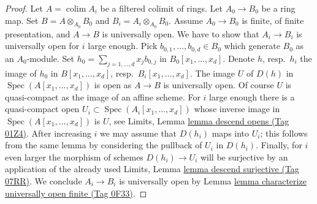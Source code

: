 \documentclass{amsart}
\theoremstyle{plain}
\theoremstyle{definition}
\theoremstyle{remark}
\numberwithin{equation}{subsection}
\def\colim{\mathop{\mathrm{colim}}\nolimits}
\def\Spec{\mathop{\mathrm{Spec}}}
\begin{document}
\begin{proof}
\medskip\noindent
Let $A = \colim A_i$ be a filtered colimit of rings.
Let $A_0 \to B_0$ be a ring map. Set $B = A \otimes_{A_0} B_0$ and
$B_i = A_i \otimes_{A_0} B_0$. Assume $A_0 \to B_0$ is finite,
of finite presentation, and $A \to B$ is universally open.
We have to show that $A_i \to B_i$ is universally open for $i$ large enough.
Pick $b_{0, 1}, \ldots, b_{0, d} \in B_0$ which generate $B_0$
as an $A_0$-module. Set $h_0 = \sum_{j = 1, \ldots, d} x_jb_{0, j}$
in $B_0[x_1, \ldots, x_d]$. Denote $h$, resp.\ $h_i$ the image of $h_0$
in $B[x_1, \ldots, x_d]$, resp.\ $B_i[x_1, \ldots, x_d]$.
The image $U$ of $D(h)$ in $\Spec(A[x_1, \ldots, x_d])$ is open
as $A \to B$ is universally open. Of course $U$ is quasi-compact
as the image of an affine scheme. For $i$ large enough there
is a quasi-compact open $U_i \subset \Spec(A_i[x_1, \ldots, x_d])$
whose inverse image in $\Spec(A[x_1, \ldots, x_d])$ is $U$, see
Limits, Lemma \href{https://stacks.math.columbia.edu/tag/01Z4}{lemma descend opens (Tag 01Z4)}.
After increasing $i$ we may assume that $D(h_i)$ maps
into $U_i$; this follows from the same lemma by considering the
pullback of $U_i$ in $D(h_i)$. Finally, for $i$ even larger
the morphism of schemes $D(h_i) \to U_i$ will be surjective
by an application of the already used
Limits, Lemma \href{https://stacks.math.columbia.edu/tag/07RR}{lemma descend surjective (Tag 07RR)}.
We conclude $A_i \to B_i$ is universally open by
Lemma \href{https://stacks.math.columbia.edu/tag/0F33}{lemma characterize universally open finite (Tag 0F33)}.
\end{proof}
\end{document}
